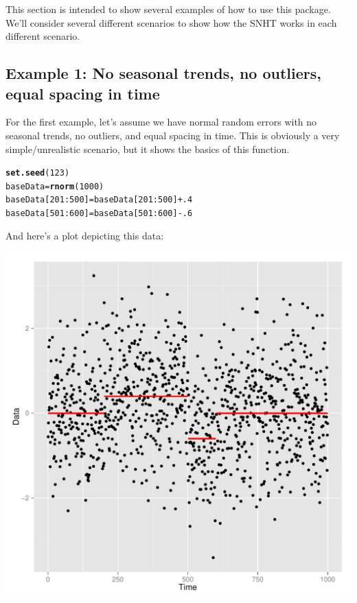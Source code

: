 \documentclass[nojss]{jss}\usepackage[]{graphicx}\usepackage[]{color}
\makeatletter
\def\maxwidth{ %
  \ifdim\Gin@nat@width>\linewidth
    \linewidth
  \else
    \Gin@nat@width
  \fi
}
\newcommand{\hlnum}[1]{\textcolor[rgb]{0.686,0.059,0.569}{#1}}%
\newcommand{\hlopt}[1]{\textcolor[rgb]{0,0,0}{#1}}%
\newcommand{\hlstd}[1]{\textcolor[rgb]{0.345,0.345,0.345}{#1}}%
\newcommand{\hlkwb}[1]{\textcolor[rgb]{0.69,0.353,0.396}{#1}}%
\newcommand{\hlkwd}[1]{\textcolor[rgb]{0.737,0.353,0.396}{\textbf{#1}}}%
\newenvironment{kframe}{%
 \def\at@end@of@kframe{}%
 \ifinner\ifhmode%
  \def\at@end@of@kframe{\end{minipage}}%
  \begin{minipage}{\columnwidth}%
 \fi\fi%
 \def\FrameCommand##1{\hskip\@totalleftmargin \hskip-\fboxsep
 \colorbox{shadecolor}{##1}\hskip-\fboxsep
     \hskip-\linewidth \hskip-\@totalleftmargin \hskip\columnwidth}%
 \MakeFramed {\advance\hsize-\width
   \@totalleftmargin\z@ \linewidth\hsize
   \@setminipage}}%
 {\par\unskip\endMakeFramed%
 \at@end@of@kframe}
\newenvironment{knitrout}{}{} %
\makeatother
\begin{document}
This section is intended to show several examples of how to use this package.  We'll consider several different scenarios to show how the SNHT works in each different scenario.

\subsection{Example 1: No seasonal trends, no outliers, equal spacing in time}

For the first example, let's assume we have normal random errors with no seasonal trends, no outliers, and equal spacing in time.  This is obviously a very simple/unrealistic scenario, but it shows the basics of this function.

\begin{knitrout}
\color{fgcolor}\begin{kframe}
\begin{alltt}
\hlkwd{set.seed}\hlstd{(}\hlnum{123}\hlstd{)}
\hlstd{baseData} \hlkwb{=} \hlkwd{rnorm}\hlstd{(}\hlnum{1000}\hlstd{)}
\hlstd{baseData[}\hlnum{201}\hlopt{:}\hlnum{500}\hlstd{]} \hlkwb{=} \hlstd{baseData[}\hlnum{201}\hlopt{:}\hlnum{500}\hlstd{]} \hlopt{+} \hlnum{.4}
\hlstd{baseData[}\hlnum{501}\hlopt{:}\hlnum{600}\hlstd{]} \hlkwb{=} \hlstd{baseData[}\hlnum{501}\hlopt{:}\hlnum{600}\hlstd{]} \hlopt{-} \hlnum{.6}
\end{alltt}
\end{kframe}
\end{knitrout}

And here's a plot depicting this data:

\begin{knitrout}
\color{fgcolor}

{\centering \includegraphics[width=\maxwidth]{figure/unnamed-chunk-2-1} 

}



\end{knitrout}
\end{document}
